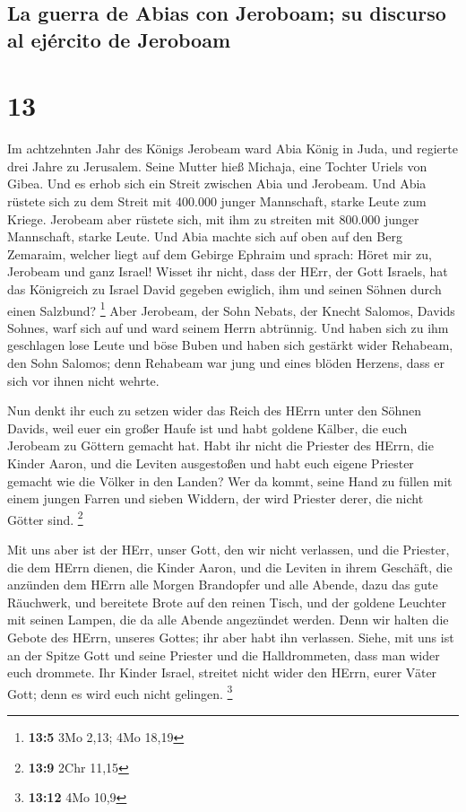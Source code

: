 \hypertarget{la-guerra-de-abias-con-jeroboam-su-discurso-al-ejuxe9rcito-de-jeroboam}{%
\subsection{La guerra de Abias con Jeroboam; su discurso al ejército de
Jeroboam}\label{la-guerra-de-abias-con-jeroboam-su-discurso-al-ejuxe9rcito-de-jeroboam}}

\hypertarget{section-12}{%
\section{13}\label{section-12}}

 Im achtzehnten Jahr des Königs Jerobeam ward Abia König
in Juda,  und regierte drei Jahre zu Jerusalem. Seine
Mutter hieß Michaja, eine Tochter Uriels von Gibea. Und es erhob sich
ein Streit zwischen Abia und Jerobeam.  Und Abia rüstete
sich zu dem Streit mit 400.000 junger Mannschaft, starke Leute zum
Kriege. Jerobeam aber rüstete sich, mit ihm zu streiten mit 800.000
junger Mannschaft, starke Leute.  Und Abia machte sich auf
oben auf den Berg Zemaraim, welcher liegt auf dem Gebirge Ephraim und
sprach: Höret mir zu, Jerobeam und ganz Israel!  Wisset
ihr nicht, dass der HErr, der Gott Israels, hat das Königreich zu Israel
David gegeben ewiglich, ihm und seinen Söhnen durch einen Salzbund?
\footnote{\textbf{13:5} 3Mo 2,13; 4Mo 18,19}  Aber
Jerobeam, der Sohn Nebats, der Knecht Salomos, Davids Sohnes, warf sich
auf und ward seinem Herrn abtrünnig.  Und haben sich zu
ihm geschlagen lose Leute und böse Buben und haben sich gestärkt wider
Rehabeam, den Sohn Salomos; denn Rehabeam war jung und eines blöden
Herzens, dass er sich vor ihnen nicht wehrte.

 Nun denkt ihr euch zu setzen wider das Reich des HErrn
unter den Söhnen Davids, weil euer ein großer Haufe ist und habt goldene
Kälber, die euch Jerobeam zu Göttern gemacht hat.  Habt
ihr nicht die Priester des HErrn, die Kinder Aaron, und die Leviten
ausgestoßen und habt euch eigene Priester gemacht wie die Völker in den
Landen? Wer da kommt, seine Hand zu füllen mit einem jungen Farren und
sieben Widdern, der wird Priester derer, die nicht Götter sind.
\footnote{\textbf{13:9} 2Chr 11,15}

 Mit uns aber ist der HErr, unser Gott, den wir nicht
verlassen, und die Priester, die dem HErrn dienen, die Kinder Aaron, und
die Leviten in ihrem Geschäft,  die anzünden dem HErrn
alle Morgen Brandopfer und alle Abende, dazu das gute Räuchwerk, und
bereitete Brote auf den reinen Tisch, und der goldene Leuchter mit
seinen Lampen, die da alle Abende angezündet werden. Denn wir halten die
Gebote des HErrn, unseres Gottes; ihr aber habt ihn verlassen.
 Siehe, mit uns ist an der Spitze Gott und seine Priester
und die Halldrommeten, dass man wider euch drommete. Ihr Kinder Israel,
streitet nicht wider den HErrn, eurer Väter Gott; denn es wird euch
nicht gelingen. \footnote{\textbf{13:12} 4Mo 10,9}

